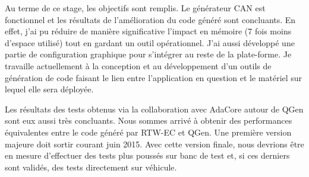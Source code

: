 Au terme de ce stage, les objectifs sont remplis. Le générateur CAN est fonctionnel et les résultats de l'amélioration du code généré sont concluants. En effet, j'ai pu réduire de manière significative l'impact en mémoire (7 fois moins d'espace utilisé) tout en gardant un outil opérationnel. J'ai aussi développé une partie de configuration graphique pour s'intégrer au reste de la plate-forme. Je travaille actuellement à la conception et au développement d'un outils de génération de code faisant le lien entre l'application en question et le matériel sur lequel elle sera déployée.

Les résultats des tests obtenus via la collaboration avec AdaCore autour de QGen sont eux aussi très concluants. Nous sommes arrivé à obtenir des performances équivalentes entre le code généré par RTW-EC\up{\circledR} et QGen. Une première version majeure doit sortir courant juin 2015. Avec cette version finale, nous devrions être en mesure d'effectuer des tests plus poussés sur banc de test et, si ces derniers sont validés, des tests directement sur véhicule.



